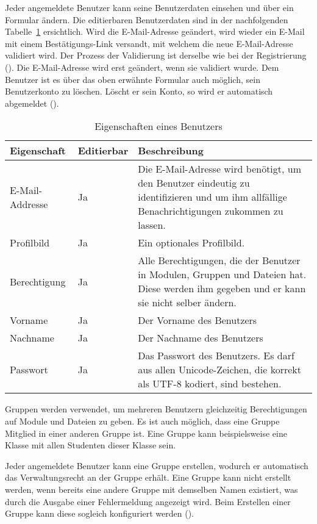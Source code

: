 Jeder angemeldete Benutzer kann seine Benutzerdaten einsehen und über ein Formular ändern. Die editierbaren Benutzerdaten sind in der nachfolgenden Tabelle~\ref{tab:benutzer_eigenschaften} ersichtlich. Wird die E-Mail-Adresse geändert, wird wieder ein E-Mail mit einem Bestätigungs-Link versandt, mit welchem die neue E-Mail-Adresse validiert wird. Der Prozess der Validierung ist derselbe wie bei der Registrierung (). Die E-Mail-Adresse wird erst geändert, wenn sie validiert wurde. 
Dem Benutzer ist es über das oben erwähnte Formular auch möglich, sein Benutzerkonto zu löschen. Löscht er sein Konto, so wird er automatisch abgemeldet ().

\begin{table}[H]
\begin{tabularx}{\textwidth}{|l|l|X|} \hline
\textbf{Eigenschaft} &\textbf{Editierbar} & \textbf{Beschreibung} \\ \hline
E-Mail-Addresse		& Ja 	& Die E-Mail-Adresse wird benötigt, um den Benutzer eindeutig zu identifizieren und um ihm allfällige Benachrichtigungen zukommen zu lassen.\\ \hline
Profilbild			& Ja 	& Ein optionales Profilbild.\\ \hline
Berechtigung 		& Ja 	& Alle Berechtigungen, die der Benutzer in Modulen, Gruppen und Dateien hat. Diese werden ihm gegeben und er kann sie nicht selber ändern.\\ \hline
Vorname 			& Ja 	& Der Vorname des Benutzers\\ \hline
Nachname			& Ja	& Der Nachname des Benutzers\\ \hline
Passwort			& Ja	& Das Passwort des Benutzers. Es darf aus allen Unicode-Zeichen, die korrekt als UTF-8 kodiert, sind bestehen. \\ \hline
\end{tabularx}
\caption{Eigenschaften eines Benutzers}
\label{tab:benutzer_eigenschaften}
\end{table}

Gruppen werden verwendet, um mehreren Benutzern gleichzeitig Berechtigungen auf Module und Dateien zu geben. Es ist auch möglich, dass eine Gruppe Mitglied in einer anderen Gruppe ist. Eine Gruppe kann beispielsweise eine Klasse mit allen Studenten dieser Klasse sein.

Jeder angemeldete Benutzer kann eine Gruppe erstellen, wodurch er automatisch das Verwaltungsrecht an der Gruppe erhält. Eine Gruppe kann nicht erstellt werden, wenn bereits eine andere Gruppe mit demselben Namen existiert, was durch die Ausgabe einer Fehlermeldung angezeigt wird.
Beim Erstellen einer Gruppe kann diese sogleich konfiguriert werden ().

